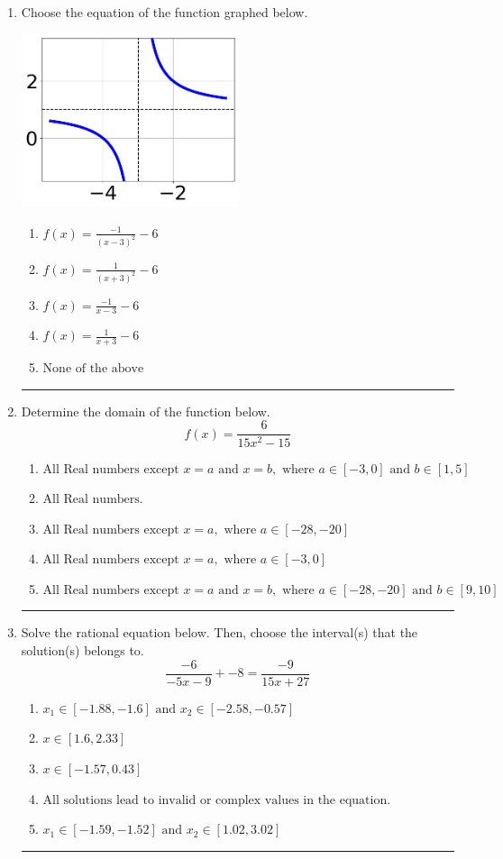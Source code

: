 \documentclass[14pt]{extbook}
\newcommand{\litem}[1]{\item#1\hspace*{-1cm}\rule{\textwidth}{0.4pt}}
\begin{document}
\begin{enumerate}
\litem{
Choose the equation of the function graphed below.
\begin{center}
    \includegraphics[width=0.5\textwidth]{../Figures/rationalGraphToEquationCopyB.png}
\end{center}
\begin{enumerate}[label=\Alph*.]
\item \( f(x) = \frac{-1}{(x - 3)^2} - 6 \)
\item \( f(x) = \frac{1}{(x + 3)^2} - 6 \)
\item \( f(x) = \frac{-1}{x - 3} - 6 \)
\item \( f(x) = \frac{1}{x + 3} - 6 \)
\item \( \text{None of the above} \)

\end{enumerate} }
\litem{
Determine the domain of the function below.\[ f(x) = \frac{6}{15x^{2} -15} \]\begin{enumerate}[label=\Alph*.]
\item \( \text{All Real numbers except } x = a \text{ and } x = b, \text{ where } a \in [-3, 0] \text{ and } b \in [1, 5] \)
\item \( \text{All Real numbers.} \)
\item \( \text{All Real numbers except } x = a, \text{ where } a \in [-28, -20] \)
\item \( \text{All Real numbers except } x = a, \text{ where } a \in [-3, 0] \)
\item \( \text{All Real numbers except } x = a \text{ and } x = b, \text{ where } a \in [-28, -20] \text{ and } b \in [9, 10] \)

\end{enumerate} }
\litem{
Solve the rational equation below. Then, choose the interval(s) that the solution(s) belongs to.\[ \frac{-6}{-5x -9} + -8 = \frac{-9}{15x + 27} \]\begin{enumerate}[label=\Alph*.]
\item \( x_1 \in [-1.88, -1.6] \text{ and } x_2 \in [-2.58,-0.57] \)
\item \( x \in [1.6,2.33] \)
\item \( x \in [-1.57,0.43] \)
\item \( \text{All solutions lead to invalid or complex values in the equation.} \)
\item \( x_1 \in [-1.59, -1.52] \text{ and } x_2 \in [1.02,3.02] \)


\end{enumerate}}
\end{enumerate}
\end{document}
